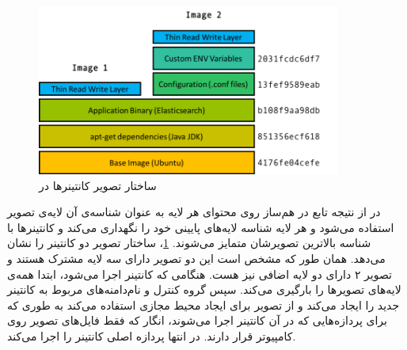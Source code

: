       \begin{figure}[]
        \centerline{\includegraphics[width=10cm]{graphics/chapter_2/docker_image}}
        \caption{ساختار تصویر کانتینر‌ها در  \cite{2019demystifying}}
        \label{fig:chapter_2:docker_image}
      \end{figure}

      در  از نتیجه تابع در هم‌ساز  روی محتوای هر لایه به عنوان شناسه‌ی آن لایه‌ی تصویر استفاده می‌شود و هر لایه شناسه لایه‌های پایینی خود را نگهداری می‌کند و کانتینر‌ها با شناسه بالاترین تصویرشان متمایز می‌شوند.
      \cref{fig:chapter_2:docker_image}، ساختار تصویر دو کانتینر را نشان می‌دهد.
      همان طور که مشخص است این دو تصویر دارای سه لایه مشترک هستند و تصویر ۲ دارای دو لایه اضافی نیز هست.
      هنگامی که کانتینر اجرا می‌شود،  ابتدا همه‌ی لایه‌های تصویر‌ها را بارگیری می‌کند.
      سپس گروه کنترل و نام‌دامنه‌های مربوط به کانتینر جدید را ایجاد می‌کند و از تصویر برای ایجاد محیط مجازی استفاده می‌کند به طوری که برای پردازه‌هایی که در آن کانتینر اجرا می‌شوند، انگار که فقط فایل‌های تصویر روی کامپیوتر قرار دارند.
      در انتها پردازه اصلی کانتینر را اجرا می‌کند.

